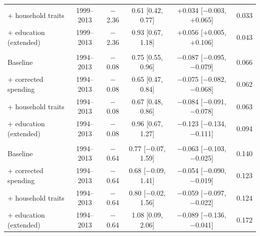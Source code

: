 \begin{tabular}{lccccc}
+ household traits & 1999--2013 & $-$2.36 & 0.61 [0.42, 0.77] & +0.034 [$-$0.003, +0.065] & 0.033 \\
+ education (extended) & 1999--2013 & $-$2.36 & 0.93 [0.67, 1.18] & +0.056 [+0.005, +0.106] & 0.043 \\
\addlinespace
\multicolumn{6}{l}{\textit{CE price paid, median}} \\
Baseline & 1994--2013 & $-$0.08 & 0.75 [0.55, 0.96] & $-$0.087 [$-$0.095, $-$0.079] & 0.066 \\
+ corrected spending & 1994--2013 & $-$0.08 & 0.65 [0.47, 0.84] & $-$0.075 [$-$0.082, $-$0.068] & 0.062 \\
+ household traits & 1994--2013 & $-$0.08 & 0.67 [0.48, 0.86] & $-$0.084 [$-$0.091, $-$0.078] & 0.063 \\
+ education (extended) & 1994--2013 & $-$0.08 & 0.96 [0.67, 1.27] & $-$0.123 [$-$0.134, $-$0.111] & 0.094 \\
\addlinespace
\multicolumn{6}{l}{\textit{CE price paid, 90th percentile}} \\
Baseline & 1994--2013 & $-$0.64 & 0.77 [$-$0.07, 1.59] & $-$0.063 [$-$0.103, $-$0.025] & 0.140 \\
+ corrected spending & 1994--2013 & $-$0.64 & 0.68 [$-$0.09, 1.41] & $-$0.054 [$-$0.090, $-$0.019] & 0.123 \\
+ household traits & 1994--2013 & $-$0.64 & 0.80 [$-$0.02, 1.56] & $-$0.059 [$-$0.097, $-$0.022] & 0.124 \\
+ education (extended) & 1994--2013 & $-$0.64 & 1.08 [0.09, 2.06] & $-$0.089 [$-$0.136, $-$0.041] & 0.172 \\
\bottomrule
\end{tabular}
